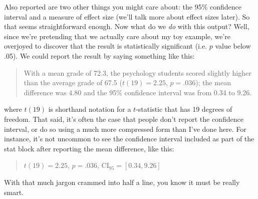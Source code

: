 Also reported are two other things you might care about: the 95\% confidence interval and a measure of effect size (we'll talk more about effect sizes later). So that seems straightforward enough. Now what do we {\it do} with this output? Well, since we're pretending that we actually care about my toy example, we're overjoyed to discover that the result is statistically significant (i.e. $p$ value below .05). We could report the result by saying something like this:
\begin{quote}
With a mean grade of 72.3, the psychology students scored slightly higher than the average grade of 67.5 ($t(19) = 2.25$, $p=.036$); the mean difference was 4.80 and the 95\% confidence interval was from 0.34 to 9.26.
\end{quote}
where $t(19)$ is shorthand notation for a $t$-statistic that has 19 degrees of freedom. That said, it's often the case that people don't report the confidence interval, or do so using a much more compressed form than I've done here. For instance, it's not uncommon to see the confidence interval included as part of the stat block after reporting the mean difference, like this:
\begin{quote}
$t(19) = 2.25$, $p=.036$, CI$_{95} = [0.34, 9.26]$
\end{quote}
With that much jargon crammed into half a line, you know it must be really smart.


